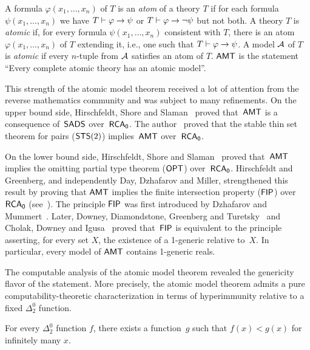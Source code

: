 \begin{definition}
A formula $\varphi(x_1, \dots, x_n)$ of $T$ is an \emph{atom} of a theory $T$ if for each formula $\psi(x_1, \dots, x_n)$
  we have $T \vdash \varphi \rightarrow \psi$ or $T \vdash \varphi \rightarrow \neg \psi$ but not both.
  A theory $T$ is \emph{atomic} if, for every formula $\psi(x_1, \dots, x_n)$ consistent with $T$,
  there is an atom $\varphi(x_1, \dots, x_n)$ of $T$ extending it, i.e., one such that $T \vdash \varphi \rightarrow \psi$.
  A model $\mathcal{A}$ of $T$ is \emph{atomic} if every $n$-tuple from $\mathcal{A}$ satisfies an atom of $T$. 
$\operatorname{\sf{AMT}}$ is the statement ``Every complete atomic theory has an atomic model''.
\end{definition}

This strength of the atomic model theorem received a lot of attention from the reverse mathematics community 
and was subject to many refinements.
On the upper bound side, Hirschfeldt, Shore and Slaman~\cite{Hirschfeldt2009atomic} 
proved that~$\operatorname{\sf{AMT}}$ is a consequence of~$\operatorname{\sf{SADS}}$ over~$\operatorname{\sf{RCA}_0}$. 
The author~\cite{Patey2015Somewhere} proved that the stable thin set theorem for pairs ($\operatorname{\sf{STS}}(2)$) implies~$\operatorname{\sf{AMT}}$ over~$\operatorname{\sf{RCA}_0}$.

On the lower bound side, Hirschfeldt, Shore and Slaman~\cite{Hirschfeldt2009atomic} proved that~$\operatorname{\sf{AMT}}$
implies the omitting partial type theorem ($\operatorname{\sf{OPT}}$) over~$\operatorname{\sf{RCA}_0}$. 
Hirschfeldt and Greenberg, and independently Day, Dzhafarov and Miller, 
strengthened this result by proving that $\operatorname{\sf{AMT}}$ implies the finite intersection property ($\operatorname{\sf{FIP}}$) over~$\operatorname{\sf{RCA}_0}$ (see~\cite{Hirschfeldt2015Slicing}).
The principle $\operatorname{\sf{FIP}}$ was first introduced by Dzhafarov and Mummert~\cite{Dzhafarov2013strength}. 
Later, Downey, Diamondstone, Greenberg and Turetsky~\cite{Downey2012Finite} and 
Cholak, Downey and Igusa~\cite{Cholak2015Any} proved that~$\operatorname{\sf{FIP}}$ is equivalent to the principle asserting, for every set $X$,
the existence of a 1-generic relative to~$X$. In particular, every model of $\operatorname{\sf{AMT}}$ contains 1-generic reals.

The computable analysis of the atomic model theorem revealed the genericity flavor of the statement.
More precisely, the atomic model theorem admits a pure computability-theoretic characterization
in terms of hyperimmunity relative to a fixed $\Delta^0_2$ function. 

\begin{definition}
For every $\Delta^0_2$ function $f$, there exists a function~$g$ such that $f(x) < g(x)$ for infinitely many $x$.
\end{definition}

